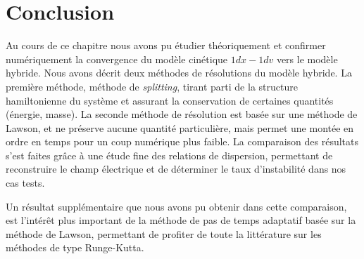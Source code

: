 
\section{Conclusion}

Au cours de ce chapitre nous avons pu étudier théoriquement et confirmer numériquement la convergence du modèle cinétique $1dx-1dv$ vers le modèle hybride. Nous avons décrit deux méthodes de résolutions du modèle hybride. La première méthode, méthode de \emph{splitting}, tirant parti de la structure hamiltonienne du système et assurant la conservation de certaines quantités (énergie, masse). La seconde méthode de résolution est basée sur une méthode de Lawson, et ne préserve aucune quantité particulière, mais permet une montée en ordre en temps pour un coup numérique plus faible. La comparaison des résultats s'est faites grâce à une étude fine des relations de dispersion, permettant de reconstruire le champ électrique et de déterminer le taux d'instabilité dans nos cas tests.

Un résultat supplémentaire que nous avons pu obtenir dans cette comparaison, est l'intérêt plus important de la méthode de pas de temps adaptatif basée sur la méthode de Lawson, permettant de profiter de toute la littérature sur les méthodes de type Runge-Kutta.
